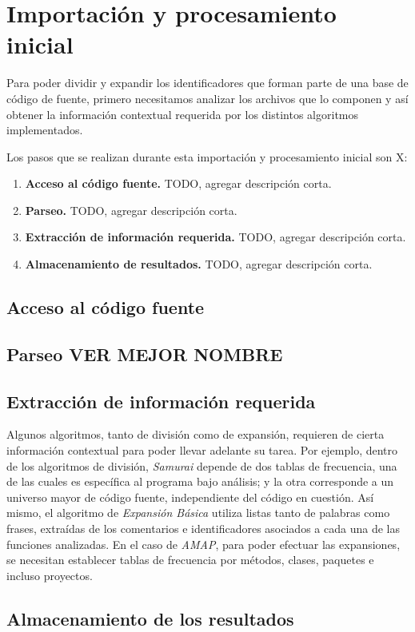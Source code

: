 \section{Importación y procesamiento inicial}

Para poder dividir y expandir los identificadores que forman parte de una base de código de fuente, primero necesitamos analizar los archivos que lo componen y así obtener la información contextual requerida por los distintos algoritmos implementados.

Los pasos que se realizan durante esta importación y procesamiento inicial son X:
\begin{enumerate}
  \item \textbf{Acceso al código fuente.} TODO, agregar descripción corta.
  \item \textbf{Parseo.} TODO, agregar descripción corta.
  \item \textbf{Extracción de información requerida.} TODO, agregar descripción corta.
  \item \textbf{Almacenamiento de resultados.} TODO, agregar descripción corta.
\end{enumerate}

\subsection{Acceso al código fuente}

\subsection{Parseo VER MEJOR NOMBRE}

\subsection{Extracción de información requerida}
Algunos algoritmos, tanto de división como de expansión, requieren de cierta información contextual para poder llevar adelante su tarea.
Por ejemplo, dentro de los algoritmos de división, \textit{Samurai} depende de dos tablas de frecuencia, una de las cuales es específica al programa bajo análisis; y la otra corresponde a un universo mayor de código fuente, independiente del código en cuestión.
Así mismo, el algoritmo de \textit{Expansión Básica} utiliza listas tanto de palabras como frases, extraídas de los comentarios e identificadores asociados a cada una de las funciones analizadas.
En el caso de \textit{AMAP}, para poder efectuar las expansiones, se necesitan establecer tablas de frecuencia por métodos, clases, paquetes e incluso proyectos.

\subsection{Almacenamiento de los resultados}
